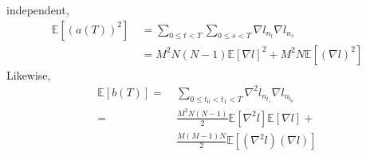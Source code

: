 \documentclass{article}
\newcommand{\expct}[1]{\mathbb{E}\left[#1\right]}
\begin{document}
            independent,
            \begin{align*}
                \expct{(a(T))^2}
                ~&=
                \sum_{0\leq t<T} \sum_{0\leq s<T} \nabla l_{n_t} \nabla l_{n_s} \\
                ~&= 
                M^2N(N-1)   \expct{\nabla l}^2 +
                M^2N        \expct{(\nabla l)^2}
            \end{align*}
            Likewise, 
            \begin{align*}
                \expct{b(T)}
                = 
                ~&\sum_{0\leq t_0 < t_1 < T} \nabla^2 l_{n_{t_1}} \nabla l_{n_{t_0}} \\
                =
                ~&\frac{M^2N(N-1)}{2} \expct{\nabla^2 l} \expct{\nabla l} + \\
                ~&\frac{M(M-1)N}{2}  \expct{(\nabla^2 l) (\nabla l)} 
            \end{align*}
\end{document}
